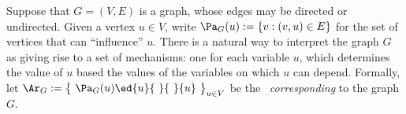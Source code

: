     \label{sec:qim-bns}
%    
Suppose that
$G = (V,E)$ is a graph, whose edges may be directed or undirected.
Given a vertex $u \in V$,
write $\Pa_G(u) := \{ v : (v,u) \in E\}$
    for the set of vertices that can ``influence'' $u$.
There is a natural way to interpret the graph $G$ as giving rise to a set of mechanisms:
    one for each variable $u$, 
    which determines the value of $u$ based
    the values of the variables on which $u$ can depend. 
Formally, let
$\Ar_G := 
    \smash{\big\{} 
    ~{\Pa}_G(u) \ed{u}{~}{~} \{ u \} ~
    \smash{\big\}_{u \in V}}$
be the \hgraph\ \emph{corresponding} to the graph $G$.
